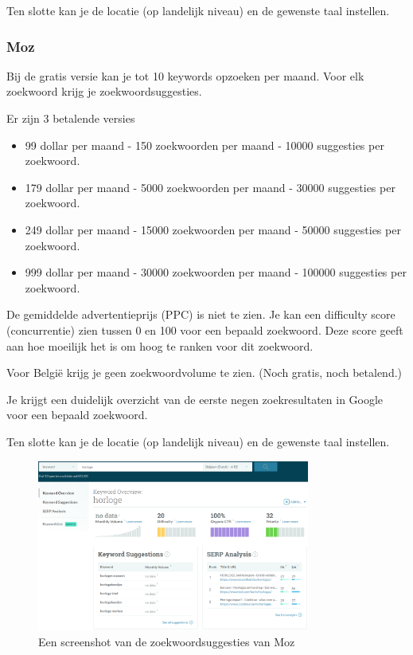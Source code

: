 Ten slotte kan je de locatie (op landelijk niveau) en de gewenste taal instellen.

\newpage
\subsubsection{Moz}
\label{ch: Moz}

Bij de gratis versie kan je tot 10 keywords opzoeken per maand. Voor elk zoekwoord krijg je zoekwoordsuggesties.

Er zijn 3 betalende versies 

\begin{itemize}
\item 99 dollar per maand - 150 zoekwoorden per maand - 10000 suggesties per zoekwoord.
\item 179 dollar per maand - 5000 zoekwoorden per maand - 30000 suggesties per zoekwoord.
\item 249 dollar per maand - 15000 zoekwoorden per maand - 50000 suggesties per zoekwoord.
\item 999 dollar per maand - 30000 zoekwoorden per maand - 100000 suggesties per zoekwoord.
\end{itemize}

De gemiddelde advertentieprijs (PPC) is niet te zien. Je kan een difficulty score (concurrentie) zien tussen 0 en 100 voor een bepaald zoekwoord. Deze score geeft aan hoe moeilijk het is om hoog te ranken voor dit zoekwoord. 

Voor België krijg je geen zoekwoordvolume te zien. (Noch gratis, noch betalend.)

Je krijgt een duidelijk overzicht van de eerste negen zoekresultaten in Google voor een bepaald zoekwoord. 

Ten slotte kan je de locatie (op landelijk niveau) en de gewenste taal instellen.

\begin{figure}[h!]
\centering
\includegraphics[width=0.8\textwidth]{img/moz.PNG}
\caption{Een screenshot van de zoekwoordsuggesties van Moz
\autocite{moz}}
\end{figure}

